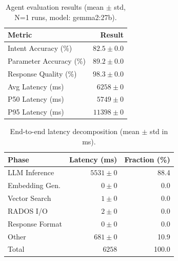 
\begin{table}[t]
\centering
\caption{Agent evaluation results (mean $\pm$ std, N=1 runs, model: gemma2:27b).}
\label{tab:eval-results}
\begin{tabular}{lr}
\toprule
\textbf{Metric} & \textbf{Result} \\
\midrule
Intent Accuracy (\%) & $82.5 \pm 0.0$ \\
Parameter Accuracy (\%) & $89.2 \pm 0.0$ \\
Response Quality (\%) & $98.3 \pm 0.0$ \\
\midrule
Avg Latency (ms) & $6258 \pm 0$ \\
P50 Latency (ms) & $5749 \pm 0$ \\
P95 Latency (ms) & $11398 \pm 0$ \\
\bottomrule
\end{tabular}
\end{table}


\begin{table}[t]
\centering
\caption{End-to-end latency decomposition (mean $\pm$ std in ms).}
\label{tab:latency-decomp}
\begin{tabular}{lrr}
\toprule
\textbf{Phase} & \textbf{Latency (ms)} & \textbf{Fraction (\%)} \\
\midrule
LLM Inference & $5531 \pm 0$ & 88.4 \\
Embedding Gen. & $0 \pm 0$ & 0.0 \\
Vector Search & $1 \pm 0$ & 0.0 \\
RADOS I/O & $2 \pm 0$ & 0.0 \\
Response Format & $0 \pm 0$ & 0.0 \\
Other & $681 \pm 0$ & 10.9 \\
\midrule
Total & $6258$ & 100.0 \\
\bottomrule
\end{tabular}
\end{table}
